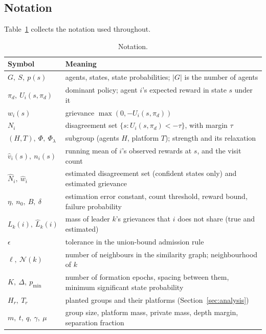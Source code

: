 \documentclass[11pt]{article}
\newcommand{\nb}{\mathcal{N}}   %
\theoremstyle{plain}
\theoremstyle{definition}
\theoremstyle{remark}
\begin{document}
\subsection{Notation}
Table~\ref{tab:notation} collects the notation used throughout.
\begin{table}[!ht]
\centering
\small
\begin{tabular}{@{}lp{12.2cm}@{}}
\toprule
\textbf{Symbol} & \textbf{Meaning} \\
\midrule
$G,\ S,\ p(s)$ & agents, states, state probabilities; $|G|$ is the number of agents \\
$\pi_d,\ U_i(s,\pi_d)$ & dominant policy; agent $i$'s expected reward in state $s$ under it \\
$w_i(s)$ & grievance $\max(0,-U_i(s,\pi_d))$ \\
$N_i$ & disagreement set $\{s : U_i(s,\pi_d)<-\tau\}$, with margin $\tau$ \\
$(H,T),\ \Phi,\ \Phi_\lambda$ & subgroup (agents $H$, platform $T$); strength and its relaxation \\
$\hat v_i(s),\ n_i(s)$ & running mean of $i$'s observed rewards at $s$, and the visit count \\
$\hat N_i,\ \hat w_i$ & estimated disagreement set (confident states only) and estimated grievance \\
$\eta,\ n_0,\ B,\ \delta$ & estimation error constant, count threshold, reward bound, failure probability \\
$L_k(i),\ \hat L_k(i)$ & mass of leader $k$'s grievances that $i$ does not share (true and estimated) \\
$\epsilon$ & tolerance in the union-bound admission rule \\
$\ell,\ \nb(k)$ & number of neighbours in the similarity graph; neighbourhood of $k$ \\
$K,\ \Delta,\ p_{\min}$ & number of formation epochs, spacing between them, minimum significant state probability \\
$H_r,\ T_r$ & planted groups and their platforms (Section~\ref{sec:analysis}) \\
$m,\ t,\ q,\ \gamma,\ \mu$ & group size, platform mass, private mass, depth margin, separation fraction \\
\bottomrule
\end{tabular}
\caption{Notation.}
\label{tab:notation}
\end{table}
 
\end{document}
